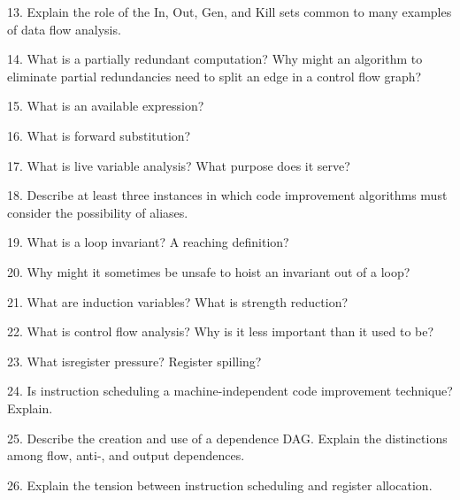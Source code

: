 \filbreak
\vskip 1cm

13. Explain the role of the In, Out, Gen, and Kill sets common to many examples of data flow analysis.

\filbreak
\vskip 1cm

14. What is a partially redundant computation? Why might an algorithm to eliminate partial redundancies need to split an edge in a control flow graph?

\filbreak
\vskip 1cm

15. What is an available expression?

\filbreak
\vskip 1cm

16. What is forward substitution?

\filbreak
\vskip 1cm

17. What is live variable analysis? What purpose does it serve?

\filbreak
\vskip 1cm

18. Describe at least three instances in which code improvement algorithms must consider the possibility of aliases.

\filbreak
\vskip 1cm

19. What is a loop invariant? A reaching definition?

\filbreak
\vskip 1cm

20. Why might it sometimes be unsafe to hoist an invariant out of a loop?

\filbreak
\vskip 1cm

21. What are induction variables? What is strength reduction?

\filbreak
\vskip 1cm

22. What is control flow analysis? Why is it less important than it used to be?

\filbreak
\vskip 1cm

23. What isregister pressure? Register spilling?

\filbreak
\vskip 1cm

24. Is instruction scheduling a machine-independent code improvement technique? Explain.

\filbreak
\vskip 1cm

25. Describe the creation and use of a dependence DAG. Explain the distinctions among flow, anti-, and output dependences.

\filbreak
\vskip 1cm

26. Explain the tension between instruction scheduling and register allocation.

\filbreak
\vskip 1cm

